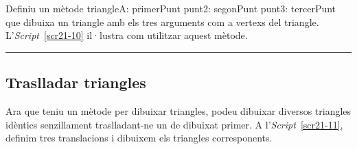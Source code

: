 \begin{center}
\colorbox{black}{}
\end{center}
{\small
\noindent
Definiu un mètode \textsf{triangleA: primerPunt punt2: segonPunt punt3: tercerPunt} que dibuixa un triangle amb els tres arguments com a vertexs del triangle. L'\emph{Script}~\ref{scr21-10} il·lustra com utilitzar aquest mètode.}\\
\noindent
\rule{\textwidth}{3pt}


\subsection{Traslladar triangles}
Ara que teniu un mètode per dibuixar triangles, podeu dibuixar diversos triangles idèntics senzillament traslladant-ne un de dibuixat primer. A l'\emph{Script}~\ref{scr21-11}, definim tres translacions i dibuixem els triangles corresponents.

